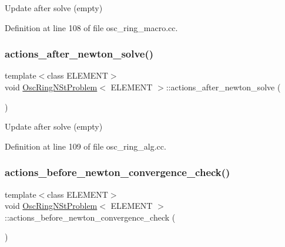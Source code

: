 Update after solve (empty) 



Definition at line 108 of file osc\+\_\+ring\+\_\+macro.\+cc.

\mbox{\label{classOscRingNStProblem_a6e4be6a46ab263941b76ab4e6706f63a}} 
\subsubsection{\texorpdfstring{actions\+\_\+after\+\_\+newton\+\_\+solve()}{actions\_after\_newton\_solve()}\hspace{0.1cm}{\footnotesize\ttfamily [2/2]}}
{\footnotesize\ttfamily template$<$class E\+L\+E\+M\+E\+NT$>$ \\
void \hyperlink{classOscRingNStProblem}{Osc\+Ring\+N\+St\+Problem}$<$ E\+L\+E\+M\+E\+NT $>$\+::actions\+\_\+after\+\_\+newton\+\_\+solve (\begin{DoxyParamCaption}{ }\end{DoxyParamCaption})\hspace{0.3cm}{\ttfamily [inline]}}



Update after solve (empty) 



Definition at line 109 of file osc\+\_\+ring\+\_\+alg.\+cc.

\mbox{\label{classOscRingNStProblem_a98d4c847cd9d53ab3569b8418ecb0c6b}} 
\subsubsection{\texorpdfstring{actions\+\_\+before\+\_\+newton\+\_\+convergence\+\_\+check()}{actions\_before\_newton\_convergence\_check()}\hspace{0.1cm}{\footnotesize\ttfamily [1/2]}}
{\footnotesize\ttfamily template$<$class E\+L\+E\+M\+E\+NT$>$ \\
void \hyperlink{classOscRingNStProblem}{Osc\+Ring\+N\+St\+Problem}$<$ E\+L\+E\+M\+E\+NT $>$\+::actions\+\_\+before\+\_\+newton\+\_\+convergence\+\_\+check (\begin{DoxyParamCaption}{ }\end{DoxyParamCaption})\hspace{0.3cm}{\ttfamily [inline]}}



